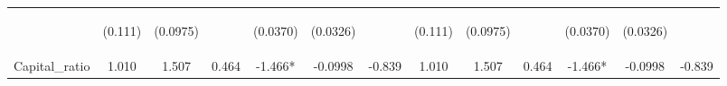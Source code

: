 \documentclass[]{article}
\begin{document}
\begin{center}
\begin{tabular}{lcccccccccccc}
\vspace{4pt} & \begin{footnotesize}(0.111)\end{footnotesize} & \begin{footnotesize}(0.0975)\end{footnotesize} & \begin{footnotesize}\end{footnotesize} & \begin{footnotesize}(0.0370)\end{footnotesize} & \begin{footnotesize}(0.0326)\end{footnotesize} & \begin{footnotesize}\end{footnotesize} & \begin{footnotesize}(0.111)\end{footnotesize} & \begin{footnotesize}(0.0975)\end{footnotesize} & \begin{footnotesize}\end{footnotesize} & \begin{footnotesize}(0.0370)\end{footnotesize} & \begin{footnotesize}(0.0326)\end{footnotesize} & \begin{footnotesize}\end{footnotesize} \\
Capital\_ratio & 1.010 & 1.507 & 0.464 & -1.466* & -0.0998 & -0.839 & 1.010 & 1.507 & 0.464 & -1.466* & -0.0998 & -0.839 \\

\end{tabular}
\end{center}
\end{document}
